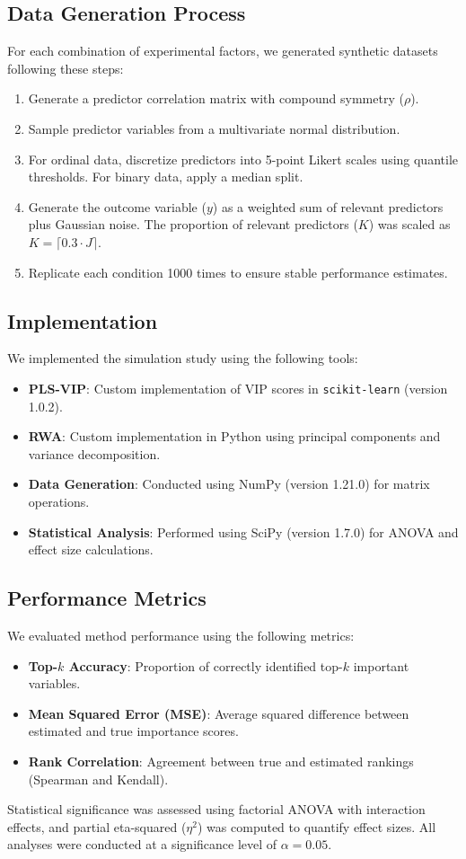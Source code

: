 \subsection{Data Generation Process}
For each combination of experimental factors, we generated synthetic datasets following these steps:
\begin{enumerate}
\item Generate a predictor correlation matrix with compound symmetry ($\rho$).
\item Sample predictor variables from a multivariate normal distribution.
\item For ordinal data, discretize predictors into 5-point Likert scales using quantile thresholds. For binary data, apply a median split.
\item Generate the outcome variable ($y$) as a weighted sum of relevant predictors plus Gaussian noise. The proportion of relevant predictors ($K$) was scaled as $K = \lceil 0.3 \cdot J \rceil$.
\item Replicate each condition 1000 times to ensure stable performance estimates.
\end{enumerate}

\subsection{Implementation}
We implemented the simulation study using the following tools:
\begin{itemize}
\item \textbf{PLS-VIP}: Custom implementation of VIP scores in \texttt{scikit-learn} (version 1.0.2).
\item \textbf{RWA}: Custom implementation in Python using principal components and variance decomposition.
\item \textbf{Data Generation}: Conducted using NumPy (version 1.21.0) for matrix operations.
\item \textbf{Statistical Analysis}: Performed using SciPy (version 1.7.0) for ANOVA and effect size calculations.
\end{itemize}

\subsection{Performance Metrics}
We evaluated method performance using the following metrics:
\begin{itemize}
\item \textbf{Top-$k$ Accuracy}: Proportion of correctly identified top-$k$ important variables.
\item \textbf{Mean Squared Error (MSE)}: Average squared difference between estimated and true importance scores.
\item \textbf{Rank Correlation}: Agreement between true and estimated rankings (Spearman and Kendall).
\end{itemize}

Statistical significance was assessed using factorial ANOVA with interaction effects, and partial eta-squared ($\eta^2$) was computed to quantify effect sizes. All analyses were conducted at a significance level of $\alpha = 0.05$.